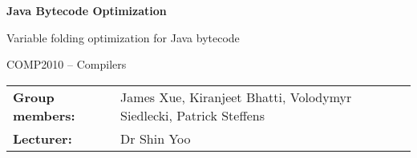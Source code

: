 \thispagestyle{empty}
\mbox{}
\vspace{1cm}
\begin{center}
\begin{Huge}
\textbf{Java Bytecode Optimization}\\
\vspace{6mm}
\end{Huge}
{\Large Variable folding optimization for Java bytecode}\\

\vspace{20mm}
\begin{Large}
COMP2010 -- Compilers
\end{Large}


\vspace{11cm}
\hspace{3cm}
\begin{tabular}{ll}
\centering
{\textbf{Group members:}} & James Xue, Kiranjeet Bhatti, Volodymyr Siedlecki, Patrick Steffens\\
{\textbf{Lecturer:}} & Dr Shin Yoo

\end{tabular}

\end{center}
